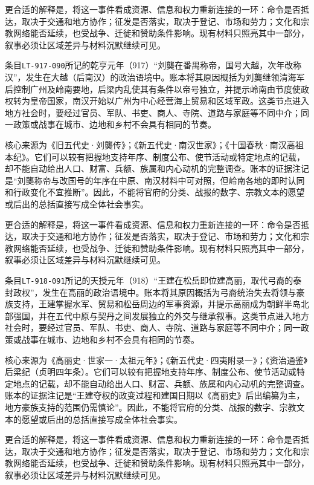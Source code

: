 更合适的解释是，将这一事件看成资源、信息和权力重新连接的一环：命令是否抵达，取决于交通和地方协作；征发是否落实，取决于登记、市场和劳力；文化和宗教网络能否延续，也受战争、迁徙和赞助条件影响。现有材料只照亮其中一部分，叙事必须让区域差异与材料沉默继续可见。

条目\texttt{LT-917-090}所记的乾亨元年（917）“刘龑在番禺称帝，国号大越，次年改称汉”，发生在大越（后南汉）的政治语境中。账本将其原因概括为刘龑继领清海军后控制广州及岭南要地，后梁内乱使其有条件以帝号独立，并提示岭南由节度使政权转为皇帝国家，南汉开始以广州为中心经营海上贸易和区域军政。这类节点进入地方社会时，要经过官员、军队、书吏、商人、寺院、道路与家庭等不同中介；同一政策或战事在城市、边地和乡村不会具有相同的节奏。

核心来源为《旧五代史·刘龑传》；《新五代史·南汉世家》；《十国春秋·南汉高祖本纪》。它们可以较有把握地支持年序、制度公布、使节活动或特定地点的记载，却不能自动给出人口、财富、兵额、族属和内心动机的完整调查。账本的证据注记是“刘龑称帝与改国号的年序在中原、南汉材料中可对照，但岭南各地的即时认同和行政变化不宜推断”。因此，不能将官府的分类、战报的数字、宗教文本的愿望或后出的总括直接写成全体社会事实。

更合适的解释是，将这一事件看成资源、信息和权力重新连接的一环：命令是否抵达，取决于交通和地方协作；征发是否落实，取决于登记、市场和劳力；文化和宗教网络能否延续，也受战争、迁徙和赞助条件影响。现有材料只照亮其中一部分，叙事必须让区域差异与材料沉默继续可见。

条目\texttt{LT-918-091}所记的天授元年（918）“王建在松岳即位建高丽，取代弓裔的泰封政权”，发生在高丽的政治语境中。账本将其原因概括为弓裔统治失去将领与豪族支持，王建掌握水军、贸易和松岳周边的军事资源，并提示高丽成为朝鲜半岛北部强国，并在五代中原与契丹之间发展独立的外交与继承叙事。这类节点进入地方社会时，要经过官员、军队、书吏、商人、寺院、道路与家庭等不同中介；同一政策或战事在城市、边地和乡村不会具有相同的节奏。

核心来源为《高丽史·世家一·太祖元年》；《新五代史·四夷附录一》；《资治通鉴》后梁纪（贞明四年条）。它们可以较有把握地支持年序、制度公布、使节活动或特定地点的记载，却不能自动给出人口、财富、兵额、族属和内心动机的完整调查。账本的证据注记是“王建夺权的政变过程和建国日期以《高丽史》后出编纂为主，地方豪族支持的范围仍需慎论”。因此，不能将官府的分类、战报的数字、宗教文本的愿望或后出的总括直接写成全体社会事实。

更合适的解释是，将这一事件看成资源、信息和权力重新连接的一环：命令是否抵达，取决于交通和地方协作；征发是否落实，取决于登记、市场和劳力；文化和宗教网络能否延续，也受战争、迁徙和赞助条件影响。现有材料只照亮其中一部分，叙事必须让区域差异与材料沉默继续可见。


